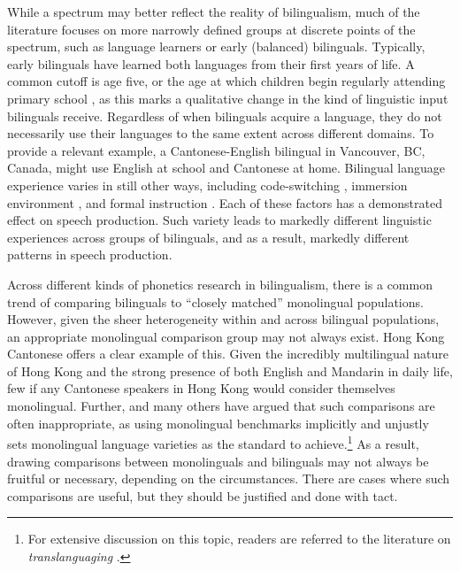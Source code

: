 While a spectrum may better reflect the reality of bilingualism, much of the literature focuses on more narrowly defined groups at discrete points of the spectrum, such as language learners or early (balanced) bilinguals. Typically, early bilinguals have learned both languages from their first years of life. A common cutoff is age five, or the age at which children begin regularly attending primary school \citep{amengual_2017_type}, as this marks a qualitative change in the kind of linguistic input bilinguals receive. Regardless of when bilinguals acquire a language, they do not necessarily use their languages to the same extent across different domains. To provide a relevant example, a Cantonese-English bilingual in Vancouver, BC, Canada, might use English at school and Cantonese at home. Bilingual language experience varies in still other ways, including code-switching \citep{fricke_2016_dimensions}, immersion environment \citep{sancier_1997_drift}, and formal instruction \citep{fricke_2019_bilingualism}. Each of these factors has a demonstrated effect on speech production. Such variety leads to markedly different linguistic experiences across groups of bilinguals, and as a result, markedly different patterns in speech production. 

Across different kinds of phonetics research in bilingualism, there is a common trend of comparing bilinguals to ``closely matched'' monolingual populations. However, given the sheer heterogeneity within and across bilingual populations, an appropriate monolingual comparison group may not always exist. Hong Kong Cantonese offers a clear example of this. Given the incredibly multilingual nature of Hong Kong and the strong presence of both English and Mandarin in daily life, few if any Cantonese speakers in Hong Kong would consider themselves monolingual. Further, \citet{grosjean_1989_bilingual} and many others have argued that such comparisons are often inappropriate, as using monolingual benchmarks implicitly and unjustly sets monolingual language varieties as the standard to achieve.\footnote{For extensive discussion on this topic, readers are referred to the literature on \textit{translanguaging} \citep[e.g.,][]{wei_2018_translanguaging}.} As a result, drawing comparisons between monolinguals and bilinguals may not always be fruitful or necessary, depending on the circumstances. There are cases where such comparisons are useful, but they should be justified and done with tact. 

